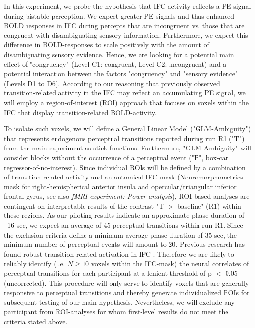 \documentclass[12pt]{article}
\begin{document}
In this experiment, we probe the hypothesis that IFC activity reflects a PE signal during bistable perception. We expect greater PE signals and thus enhanced BOLD responses in IFC during percepts that are incongruent vs. those that are congruent with disambiguating sensory information. Furthermore, we expect this difference in BOLD-responses to scale positively with the amount of disambiguating sensory evidence. Hence, we are looking for a potential main effect of "congruency" (Level C1: congruent, Level C2: incongruent) and a potential interaction between the factors "congruency" and "sensory evidence" (Levels D1 to D6). According to our reasoning that previously observed transition-related activity in the IFC \parencite{Brascamp2018} may reflect an accumulating PE signal, we will employ a region-of-interest (ROI) approach that focuses on voxels within the IFC that display transition-related BOLD-activity.  

To isolate such voxels, we will define a General Linear Model ("GLM-Ambiguity") that represents endogenous perceptual transitions reported during run R1 ("T") from the main experiment as stick-functions. Furthermore, "GLM-Ambiguity" will consider blocks without the occurrence of a perceptual event ("B", box-car regressor-of-no-interest). Since individual ROIs will be defined by a combination of transition-related activity and an antomical IFC mask (Neuromorphometrics mask for right-hemispherical anterior insula and opercular/triangular inferior frontal gyrus, see  also \textit{fMRI experiment: Power analysis}),  ROI-based analyses are contingent on interpretable results of the contrast "T $>$ baseline" (R1) within these regions. As our piloting results indicate an approximate phase duration of ~16 sec, we expect an average of 45 perceptual transitions within run R1. Since the exclusion criteria define a minimum average phase duration of 35 sec, the minimum number of perceptual events will amount to 20. Previous research has found robust transition-related activation in IFC \parencite{Lumer1998, Knapen2011, Weilnhammer2013}. Therefore we are likely to reliably identify (i.e. $N \geq 10$ voxels within the IFC-mask) the neural correlates of perceptual transitions for each participant at a lenient threshold of p $<$ 0.05 (uncorrected). This procedure will only serve to identify voxels that are generally responsive to perceptual transitions and thereby generate individualized ROIs for subsequent testing of our main hypothesis. Nevertheless, we will exclude any participant from ROI-analyses for whom first-level results do not meet the criteria stated above.
\end{document}
